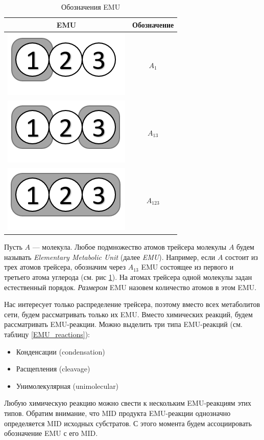 \documentclass[14pt, a4paper]{extreport}
\begin{document}
\begin{table}
	\begin{tabular}{c | c}
		EMU & Обозначение\\
		\hline
		\includegraphics[scale=0.6]{emus/EMUA1.png} & $A_1$\\
		\hline
		\includegraphics[scale=0.6]{emus/EMU13.png} & $A_{13}$\\
		\hline
		\includegraphics[scale=0.6]{emus/EMU123.png} & $A_{123}$\\
	\end{tabular}
	\caption{Обозначения EMU}
	\label{EMU}
\end{table}

Пусть $A$ --- молекула. Любое подмножество атомов трейсера молекулы $A$ будем называть \emph{Elementary Metabolic Unit} (далее \emph{EMU}). Например, если $A$ состоит из трех атомов трейсера, обозначим через $A_{13}$ EMU состоящее из первого и третьего атома углерода (см. рис \ref{EMU}). На атомах трейсера одной молекулы задан естественный порядок. \emph{Размером} EMU назовем количество атомов в этом EMU.

Нас интересует только распределение трейсера, поэтому вместо всех метаболитов сети, будем рассматривать только их EMU. Вместо химических реакций, будем рассматривать EMU-реакции. Можно выделить три типа EMU-реакций (см. таблицу \ref{EMU_reactions}):
\begin{itemize}
	\item Конденсации (condensation)
	\item Расщепления (cleavage)
	\item Унимолекулярная (unimolecular)
\end{itemize}
Любую химическую реакцию можно свести к нескольким EMU-реакциям этих типов. Обратим внимание, что MID продукта EMU-реакции однозначно определяется MID исходных субстратов. С этого момента будем ассоциировать обозначение EMU с его MID.
\end{document}
